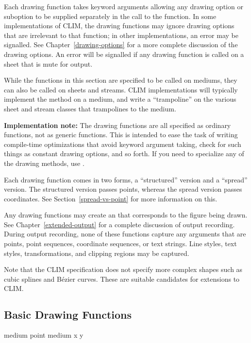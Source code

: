 Each drawing function takes keyword arguments allowing any drawing option or
suboption to be supplied separately in the call to the function.  In some
implementations of CLIM, the drawing functions may ignore drawing options that
are irrelevant to that function; in other implementations, an error may be
signalled.  See Chapter~\ref{drawing-options} for a more complete discussion of
the drawing options.  An error will be signalled if any drawing function is
called on a sheet that is mute for output.

While the functions in this section are specified to be called on mediums, they
can also be called on sheets and streams.  CLIM implementations will typically
implement the method on a medium, and write a ``trampoline'' on the various
sheet and stream classes that trampolines to the medium.

{\bf Implementation note:} The drawing functions are all specified as ordinary
functions, not as generic functions.  This is intended to ease the task of
writing compile-time optimizations that avoid keyword argument taking, check for
such things as constant drawing options, and so forth.  If you need to
specialize any of the drawing methods, use .

Each drawing function comes in two forms, a ``structured'' version and a
``spread'' version.  The structured version passes points, whereas the spread
version passes coordinates.  See Section~\ref{spread-vs-point} for more
information on this.

Any drawing functions may create an  that corresponds to the
figure being drawn.  See Chapter~\ref{extended-output} for a complete discussion
of output recording.  During output recording, none of these functions capture
any arguments that are points, point sequences, coordinate sequences, or text
strings.  Line styles, text styles, transformations, and clipping regions may be
captured.

Note that the CLIM specification does not specify more complex shapes such as
cubic splines and B\'{e}zier curves.  These are suitable candidates for
extensions to CLIM.


\subsection {Basic Drawing Functions}

  {medium point \key \DrawingOptions \PointOptions}
 {medium x y   \key \DrawingOptions \PointOptions}

